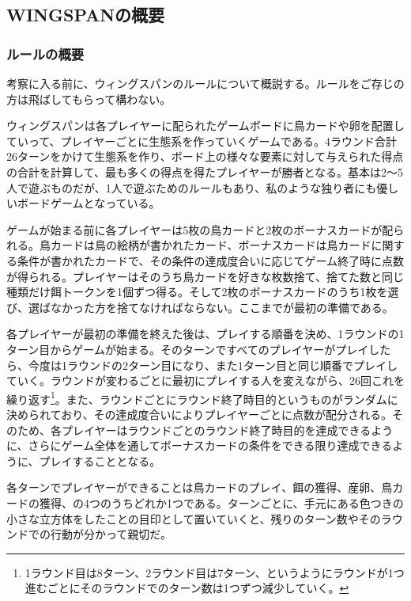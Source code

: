 \subsection{WINGSPANの概要}
\begin{multicols}{2}
\subsubsection{ルールの概要}
考察に入る前に、ウィングスパンのルールについて概説する。ルールをご存じの方は飛ばしてもらって構わない。
\par
ウィングスパンは各プレイヤーに配られたゲームボードに鳥カードや卵を配置していって、プレイヤーごとに生態系を作っていくゲームである。4ラウンド合計26ターンをかけて生態系を作り、ボード上の様々な要素に対して与えられた得点の合計を計算して、最も多くの得点を得たプレイヤーが勝者となる。基本は2～5人で遊ぶものだが、1人で遊ぶためのルールもあり、私のような独り者にも優しいボードゲームとなっている。
\par
ゲームが始まる前に各プレイヤーは5枚の鳥カードと2枚のボーナスカードが配られる。鳥カードは鳥の絵柄が書かれたカード、ボーナスカードは鳥カードに関する条件が書かれたカードで、その条件の達成度合いに応じてゲーム終了時に点数が得られる。プレイヤーはそのうち鳥カードを好きな枚数捨て、捨てた数と同じ種類だけ餌トークンを1個ずつ得る。そして2枚のボーナスカードのうち1枚を選び、選ばなかった方を捨てなければならない。ここまでが最初の準備である。
\par
各プレイヤーが最初の準備を終えた後は、プレイする順番を決め、1ラウンドの1ターン目からゲームが始まる。そのターンですべてのプレイヤーがプレイしたら、今度は1ラウンドの2ターン目になり、また1ターン目と同じ順番でプレイしていく。ラウンドが変わるごとに最初にプレイする人を変えながら、26回これを繰り返す\footnote{1ラウンド目は8ターン、2ラウンド目は7ターン、というようにラウンドが1つ進むごとにそのラウンドでのターン数は1つずつ減少していく。}。また、ラウンドごとにラウンド終了時目的というものがランダムに決められており、その達成度合いによりプレイヤーごとに点数が配分される。そのため、各プレイヤーはラウンドごとのラウンド終了時目的を達成できるように、さらにゲーム全体を通してボーナスカードの条件をできる限り達成できるように、プレイすることとなる。
\par
各ターンでプレイヤーができることは鳥カードのプレイ、餌の獲得、産卵、鳥カードの獲得、の4つのうちどれか1つである。ターンごとに、手元にある色つきの小さな立方体をしたことの目印として置いていくと、残りのターン数やそのラウンドでの行動が分かって親切だ。
\par

\end{multicols}
